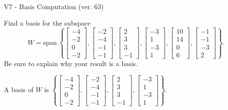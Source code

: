 \begin{exercise}
  \begin{exerciseTitle}V7 - Basis Computation (ver. 63)\end{exerciseTitle}
  \begin{exerciseStatement}
    Find a basis for the subspace 
\[W=\mathrm{span}\ \left\{\left[\begin{array}{r}
-4 \\
-2 \\
0 \\
-2
\end{array}\right] , \left[\begin{array}{r}
-2 \\
-4 \\
-1 \\
-1
\end{array}\right] , \left[\begin{array}{r}
2 \\
3 \\
3 \\
-1
\end{array}\right] , \left[\begin{array}{r}
-3 \\
1 \\
-3 \\
1
\end{array}\right] , \left[\begin{array}{r}
10 \\
14 \\
0 \\
6
\end{array}\right] , \left[\begin{array}{r}
-1 \\
-1 \\
-3 \\
2
\end{array}\right]\right\}.\]
 Be sure to explain why your result is a basis.


  \end{exerciseStatement}
  \begin{exerciseAnswer}
   A basis of \(W\) is  \(\left\{\left[\begin{array}{r}
-4 \\
-2 \\
0 \\
-2
\end{array}\right] , \left[\begin{array}{r}
-2 \\
-4 \\
-1 \\
-1
\end{array}\right] , \left[\begin{array}{r}
2 \\
3 \\
3 \\
-1
\end{array}\right] , \left[\begin{array}{r}
-3 \\
1 \\
-3 \\
1
\end{array}\right]\right\}\).
  


  \end{exerciseAnswer}
\end{exercise}
